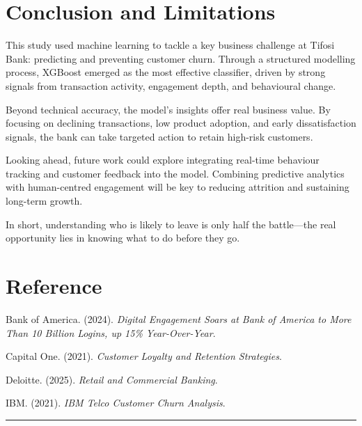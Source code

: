 \documentclass[
  letterpaper,
  DIV=11,
  numbers=noendperiod]{scrartcl}
\begin{document}
\section{Conclusion and Limitations}\label{conclusion-and-limitations}

This study used machine learning to tackle a key business challenge at
Tifosi Bank: predicting and preventing customer churn. Through a
structured modelling process, XGBoost emerged as the most effective
classifier, driven by strong signals from transaction activity,
engagement depth, and behavioural change.

Beyond technical accuracy, the model's insights offer real business
value. By focusing on declining transactions, low product adoption, and
early dissatisfaction signals, the bank can take targeted action to
retain high-risk customers.

Looking ahead, future work could explore integrating real-time behaviour
tracking and customer feedback into the model. Combining predictive
analytics with human-centred engagement will be key to reducing
attrition and sustaining long-term growth.

In short, understanding who is likely to leave is only half the
battle---the real opportunity lies in knowing what to do before they go.

\newpage

\section{Reference}\label{reference}

Bank of America. (2024). \emph{Digital Engagement Soars at Bank of
America to More Than 10 Billion Logins, up 15\% Year-Over-Year}.

Capital One. (2021). \emph{Customer Loyalty and Retention Strategies}.

Deloitte. (2025). \emph{Retail and Commercial Banking}.

IBM. (2021). \emph{IBM Telco Customer Churn Analysis}.

\begin{center}\rule{0.5\linewidth}{0.5pt}\end{center}
\end{document}
